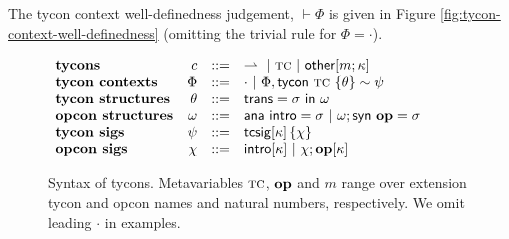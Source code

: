\noindent The tycon context well-definedness judgement, $\vdash \Phi$ is given in Figure \ref{fig:tycon-context-well-definedness} (omitting the trivial rule for $\Phi=\cdot$). 

\begin{figure}[t]
\small
$\begin{array}{lrcl}
\textbf{tycons} & c & ::= & \rightharpoonup ~|~ \textsc{tc} ~|~ {\sf other}[m; \kappa]\\
\textbf{tycon contexts} & \Phi & ::= & \cdot ~|~ \Phi, {\sf tycon}~\textsc{tc} ~\{\theta\} \sim \psi\\
\textbf{tycon structures} & \theta & ::= & {\sf trans}=\sigma~{\sf in}~\omega \\
\textbf{opcon structures} & \omega & ::= & {\sf ana}~{\sf intro}=\sigma ~|~ \omega; {\sf syn}~\textbf{op}=\sigma\\
\textbf{tycon sigs} & \psi & ::= & {\sf tcsig}[\kappa]\,\{\chi\}\\
\textbf{opcon sigs}& \chi & ::= & {\sf intro}[\kappa] ~|~ \chi; \textbf{op}[\kappa]\\
\end{array}$
\caption{Syntax of tycons. Metavariables $\textsc{tc}$, $\textbf{op}$ and $m$ range over extension tycon and opcon names and natural numbers, respectively. We omit leading $\cdot$ in examples.}
\label{syntax-TC}
\end{figure}
